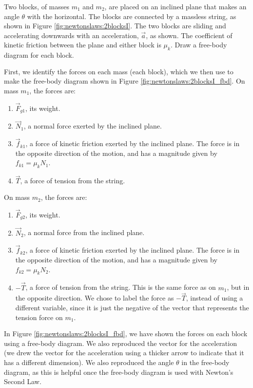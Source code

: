 \begin{example}{ Two blocks, of masses $m_1$ and $m_2$, are placed on an inclined plane that makes an angle $\theta$ with the horizontal. The blocks are connected by a massless string, as shown in Figure \ref{fig:newtonslaws:2blocksI}. The two blocks are sliding and accelerating downwards with an acceleration, $\vec a$, as shown. The coefficient of kinetic friction between the plane and either block is $\mu_k$. Draw a free-body diagram for each block.}
\label{ex:newtonslaws:2blocksI}

First, we identify the forces on each mass (each block), which we then use to make the free-body diagram shown in Figure \ref{fig:newtonslaws:2blocksI_fbd}. On mass $m_1$, the forces are:

\begin{enumerate}
\item $\vec F_{g1}$, its weight.
\item $\vec N_1$, a normal force exerted by the inclined plane.
\item $\vec f_{k1}$, a force of kinetic friction exerted by the inclined plane. The force is in the opposite direction of the motion, and has a magnitude given by $f_{k1}=\mu_kN_1$.
\item $\vec T$, a force of tension from the string. 
\end{enumerate}

On mass $m_2$, the forces are:

\begin{enumerate}
\item $\vec F_{g2}$, its weight.
\item $\vec N_2$, a normal force from the inclined plane.
\item $\vec f_{k2}$, a force of kinetic friction exerted by the inclined plane. The force is in the opposite direction of the motion, and has a magnitude given by $f_{k2}=\mu_kN_2$.
\item $-\vec T$, a force of tension from the string. This is the same force as on $m_1$, but in the opposite direction. We chose to label the force as $-\vec T$, instead of using a different variable, since it is just the negative of the vector that represents the tension force on $m_1$. 
\end{enumerate}

In Figure \ref{fig:newtonslaws:2blocksI_fbd}, we have shown the forces on each block using a free-body diagram. We also reproduced the vector for the acceleration (we drew the vector for the acceleration using a thicker arrow to indicate that it has a different dimension). We also reproduced the angle $\theta$ in the free-body diagram, as this is helpful once the free-body diagram is used with Newton's Second Law.

\end{example}

